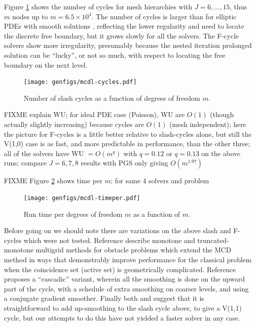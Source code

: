\documentclass[letterpaper,final,12pt,reqno]{amsart}
\theoremstyle{claim}
\numberwithin{equation}{section}
\numberwithin{figure}{section}
\numberwithin{table}{section}
\numberwithin{theorem}{section}
\begin{document}
Figure \ref{fig:mcdl-cycles} shows the number of cycles for mesh hierarchies with $J=6,\dots,15$, thus $m$ nodes up to $m=6.5 \times 10^4$.  The number of cycles is larger than for elliptic PDEs with smooth solutions \cite{Trottenbergetal2001}, reflecting the lower regularity and need to locate the discrete free boundary, but it grows slowly for all the solvers.  The F-cycle solvers show more irregularity, presumably because the nested iteration prolonged solution can be ``lucky'', or not so much, with respect to locating the free boundary on the next level.

\begin{figure}
\texttt{[image: genfigs/mcdl-cycles.pdf]}
\caption{Number of slash cycles as a function of degrees of freedom $m$.}
\label{fig:mcdl-cycles}
\end{figure}

FIXME explain WU; for ideal PDE case (Poisson), WU are $O(1)$ (though actually slightly increasing) because cycles are $O(1)$ (mesh independent); here the picture for F-cycles is a little better relative to slash-cycles alone, but still the \textsf{V(1,0)} case is as fast, and more predictable in performance, than the other three; all of the solvers have WU $=O(m^q)$ with $q=0.12$ or $q=0.13$ on the above runs; compare $J=6,7,8$ results with PGS only giving $O(m^{1.97})$

FIXME Figure \ref{fig:mcdl-timeper} shows time per $m$; for same 4 solvers and problem

\begin{figure}
\texttt{[image: genfigs/mcdl-timeper.pdf]}
\caption{Run time per degrees of freedom $m$ as a function of $m$.}
\label{fig:mcdl-timeper}
\end{figure}

Before going on we should note there are variations on the above slash and F-cycles which were not tested.  Reference \cite{GraeserKornhuber2009} describe monotone and truncated-monotone multigrid methods for obstacle problems which extend the MCD method in ways that demonstrably improve performance for the classical problem when the coincidence set (active set) is geometrically complicated.  Reference \cite{Blumetal2004} proposes a ``cascadic'' variant, wherein all the smoothing is done on the upward part of the cycle, with a schedule of extra smoothing on coarser levels, and using a conjugate gradient smoother.  Finally both \cite{Tai2003} and \cite{GraeserKornhuber2009} suggest that it is straightforward to add up-smoothing to the slash cycle above, to give a V(1,1) cycle, but our attempts to do this have not yielded a faster solver in any case.
\end{document}
